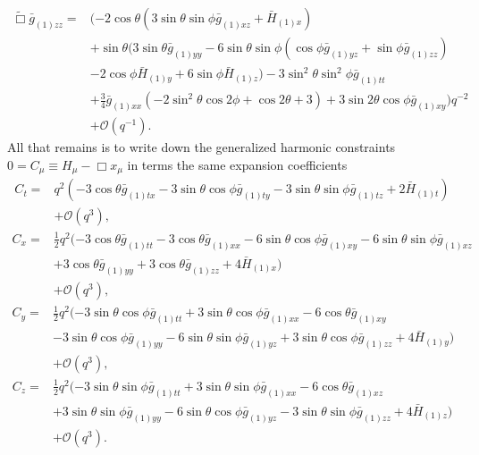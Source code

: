 \documentclass[12pt]{iopart}
\begin{document}
\begin{eqnarray}\label{eqn:efezz}
\tilde{\Box}\bar{g}_{(1)zz}=&(-2 \cos \theta  (3 \sin \theta  \sin \phi  \bar{g}_{(1)xz}+\bar{H}_{(1)x}) \nonumber \\
&+ \sin \theta  (3 \sin \theta  \bar{g}_{(1)yy}-6 \sin\theta  \sin \phi  (\cos \phi  \bar{g}_{(1)yz}+\sin \phi 
   \bar{g}_{(1)zz}) \nonumber \\
   &-2 \cos \phi  \bar{H}_{(1) y} +6 \sin \phi  \bar{H}_{(1)z}) -3  \sin ^2\theta  \sin ^2\phi  \bar{g}_{(1)tt} \nonumber \\
   &+\frac{3}{4}  \bar{g}_{(1)xx} (-2 \sin ^2\theta  \cos 2 \phi +\cos 2 \theta
   +3) +3 \sin 2 \theta  \cos \phi  \bar{g}_{(1)xy})  q^{-2} \nonumber \\
&+\mathcal{O}(q^{-1}).
\end{eqnarray}
All that remains is to write down the generalized harmonic constraints $0=C_\mu \equiv H_\mu-\Box x_\mu$ in terms the same expansion coefficients
\begin{eqnarray}\label{eqn:ct}
C_t=&q^2 (-3 \cos \theta  \bar{g}_{(1)tx}-3 \sin \theta  \cos \phi  \bar{g}_{(1)ty}-3 \sin \theta  \sin \phi \bar{g}_{(1)tz}+2
   \bar{H}_{(1) t}) \nonumber \\
   &+\mathcal{O}(q^3),
\end{eqnarray}
\begin{eqnarray}\label{eqn:cx}
C_x=&\frac{1}{2} q^2 (-3 \cos \theta  \bar{g}_{(1)tt}-3 \cos \theta  \bar{g}_{(1)xx}-6 \sin \theta  \cos \phi  \bar{g}_{(1)xy}-6 \sin
   \theta  \sin \phi  \bar{g}_{(1)xz} \nonumber \\
   &+3 \cos \theta  \bar{g}_{(1)yy}+3
   \cos \theta  \bar{g}_{(1)zz}+4 \bar{H}_{(1) x}) \nonumber \\
   &+\mathcal{O}(q^3),
\end{eqnarray}
\begin{eqnarray}\label{eqn:cy}
C_y=&\frac{1}{2} q^2 (-3 \sin \theta  \cos \phi  \bar{g}_{(1)tt}+3 \sin
   \theta  \cos \phi  \bar{g}_{(1)xx}-6 \cos \theta  \bar{g}_{(1)xy} \nonumber \\
   &-3
   \sin \theta  \cos \phi  \bar{g}_{(1) yy}-6 \sin \theta  \sin \phi
   \bar{g}_{(1)yz}+3 \sin \theta  \cos \phi  \bar{g}_{(1)zz}+4
   \bar{H}_{(1) y}) \nonumber \\
   &+\mathcal{O}(q^3),
\end{eqnarray}
\begin{eqnarray}\label{eqn:cz}
C_z=&\frac{1}{2} q^2 (-3 \sin \theta \sin \phi  \bar{g}_{(1)tt}+3 \sin
   \theta \sin \phi \bar{g}_{(1)xx}-6 \cos \theta  \bar{g}_{(1)xz} \nonumber \\
   &+3
   \sin \theta \sin \phi  \bar{g}_{(1)yy}-6 \sin \theta  \cos \phi    \bar{g}_{(1)yz}-3 \sin \theta  \sin \phi  \bar{g}_{(1)zz}+4
   \bar{H}_{(1)z}) \nonumber \\
   &+\mathcal{O}(q^3).
\end{eqnarray}
\end{document}
